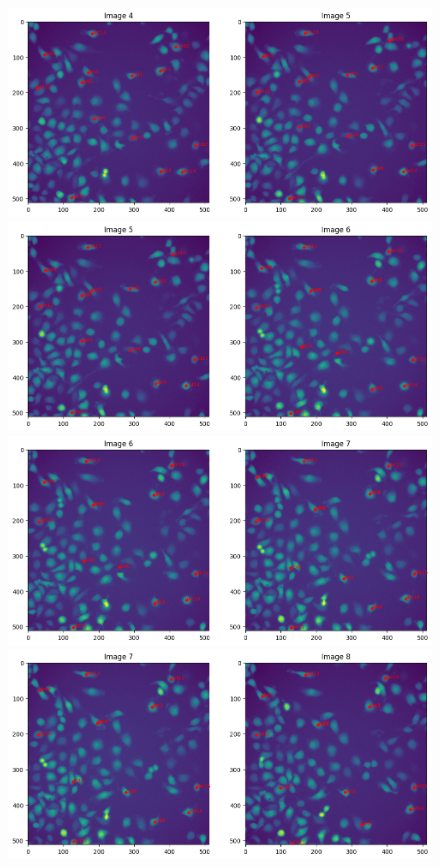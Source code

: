 \documentclass{article}
\begin{document}
\clearpage

\begin{figure}[h!]
\centering
\includegraphics[width=0.75\linewidth]{Report/RImages/Traces_Control/image_5a.png}
\includegraphics[width=0.75\linewidth]{Report/RImages/Traces_Control/image_6a.png}
\includegraphics[width=0.75\linewidth]{Report/RImages/Traces_Control/image_7a.png}
\includegraphics[width=0.75\linewidth]{Report/RImages/Traces_Control/image_8a.png}
\end{figure}

\clearpage
\end{document}
